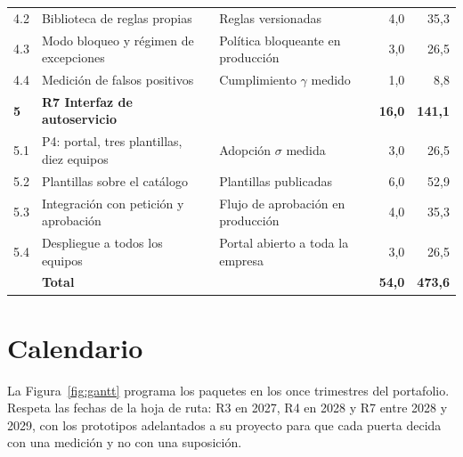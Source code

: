 \documentclass[11pt,letterpaper]{article}
\begin{document}
\begin{table}[H]
\begin{tabularx}{\textwidth}{@{}l>{\raggedright\arraybackslash}p{5.4cm}>{\raggedright\arraybackslash}Xrr@{}}
4.2 & Biblioteca de reglas propias & Reglas versionadas & 4,0 & 35,3 \\
4.3 & Modo bloqueo y régimen de excepciones & Política bloqueante en producción & 3,0 & 26,5 \\
4.4 & Medición de falsos positivos & Cumplimiento $\gamma$ medido & 1,0 & 8,8 \\
\addlinespace[2pt]
\textbf{5} & \textbf{R7 Interfaz de autoservicio} & & \textbf{16,0} & \textbf{141,1} \\
5.1 & P4: portal, tres plantillas, diez equipos & Adopción $\sigma$ medida & 3,0 & 26,5 \\
5.2 & Plantillas sobre el catálogo & Plantillas publicadas & 6,0 & 52,9 \\
5.3 & Integración con petición y aprobación & Flujo de aprobación en producción & 4,0 & 35,3 \\
5.4 & Despliegue a todos los equipos & Portal abierto a toda la empresa & 3,0 & 26,5 \\
\midrule
 & \textbf{Total} & & \textbf{54,0} & \textbf{473,6} \\
\bottomrule
\end{tabularx}
\end{table}

\section{Calendario}
\label{sec:calendario}

La Figura~\ref{fig:gantt} programa los paquetes en los once trimestres del
portafolio. Respeta las fechas de la hoja de ruta: R3 en 2027, R4 en 2028 y R7
entre 2028 y 2029, con los prototipos adelantados a su proyecto para que cada
puerta decida con una medición y no con una suposición.
\end{document}
